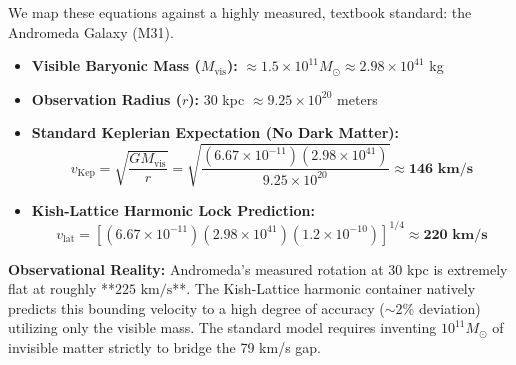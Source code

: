 \documentclass[11pt, letterpaper, openany]{book}
\begin{document}
We map these equations against a highly measured, textbook standard: the Andromeda Galaxy (M31).

\begin{itemize}
    \item \textbf{Visible Baryonic Mass ($M_{\text{vis}}$):} $\approx 1.5 \times 10^{11} M_\odot \approx 2.98 \times 10^{41}$ kg
    \item \textbf{Observation Radius ($r$):} 30 kpc $\approx 9.25 \times 10^{20}$ meters
    \item \textbf{Standard Keplerian Expectation (No Dark Matter):} 
    \[
    v_{\text{Kep}} = \sqrt{\frac{G M_{\text{vis}}}{r}} = \sqrt{\frac{(6.67 \times 10^{-11})(2.98 \times 10^{41})}{9.25 \times 10^{20}}} \approx \mathbf{146 \text{ km/s}}
    \]
    \item \textbf{Kish-Lattice Harmonic Lock Prediction:}
    \[
    v_{\text{lat}} = \left[ (6.67 \times 10^{-11})(2.98 \times 10^{41})(1.2 \times 10^{-10}) \right]^{1/4} \approx \mathbf{220 \text{ km/s}}
    \]
\end{itemize}

\textbf{Observational Reality:} Andromeda's measured rotation at 30 kpc is extremely flat at roughly **$225 \text{ km/s}$**. The Kish-Lattice harmonic container natively predicts this bounding velocity to a high degree of accuracy ($\sim 2\%$ deviation) utilizing only the visible mass. The standard model requires inventing $10^{11} M_\odot$ of invisible matter strictly to bridge the 79 km/s gap.

\vspace{0.5cm}
\begin{center}
\end{center}
\end{document}
